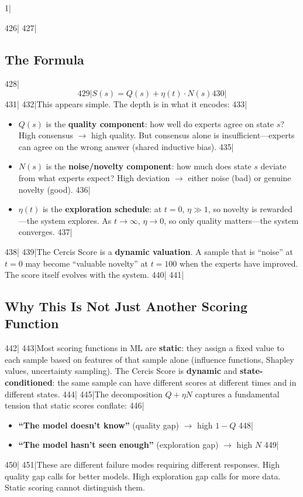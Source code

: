 1|\documentclass[12pt,a4paper]{article}
\begin{document}
426|
427|\subsection{The Formula}
428|\[
429|S(s) = Q(s) + \eta(t) \cdot N(s)
430|\]
431|
432|This appears simple. The depth is in what it encodes:
433|\begin{itemize}
434|\item $Q(s)$ is the \textbf{quality component}: how well do experts agree on state $s$? High consensus $\to$ high quality. But consensus alone is insufficient—experts can agree on the wrong answer (shared inductive bias).
435|\item $N(s)$ is the \textbf{noise/novelty component}: how much does state $s$ deviate from what experts expect? High deviation $\to$ either noise (bad) or genuine novelty (good).
436|\item $\eta(t)$ is the \textbf{exploration schedule}: at $t = 0$, $\eta \gg 1$, so novelty is rewarded—the system explores. As $t \to \infty$, $\eta \to 0$, so only quality matters—the system converges.
437|\end{itemize}
438|
439|The Cercis Score is a \textbf{dynamic valuation}. A sample that is ``noise'' at $t = 0$ may become ``valuable novelty'' at $t = 100$ when the experts have improved. The score itself evolves with the system.
440|
441|\subsection{Why This Is Not Just Another Scoring Function}
442|
443|Most scoring functions in ML are \textbf{static}: they assign a fixed value to each sample based on features of that sample alone (influence functions, Shapley values, uncertainty sampling). The Cercis Score is \textbf{dynamic} and \textbf{state-conditioned}: the same sample can have different scores at different times and in different states.
444|
445|The decomposition $Q + \eta N$ captures a fundamental tension that static scores conflate:
446|\begin{itemize}
447|\item \textbf{``The model doesn't know''} (quality gap) $\to$ high $1-Q$
448|\item \textbf{``The model hasn't seen enough''} (exploration gap) $\to$ high $N$
449|\end{itemize}
450|
451|These are different failure modes requiring different responses. High quality gap calls for better models. High exploration gap calls for more data. Static scoring cannot distinguish them.
\end{document}
